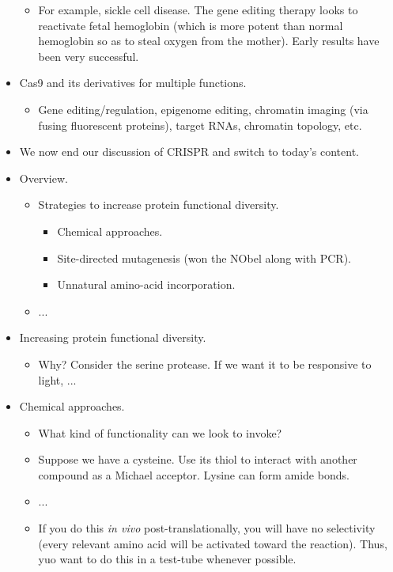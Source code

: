 \documentclass[../notes.tex]{subfiles}
\begin{document}
\begin{itemize}
    \begin{itemize}
        \item For example, sickle cell disease. The gene editing therapy looks to reactivate fetal hemoglobin (which is more potent than normal hemoglobin so as to steal oxygen from the mother). Early results have been very successful.
    \end{itemize}
    \item Cas9 and its derivatives for multiple functions.
    \begin{itemize}
        \item Gene editing/regulation, epigenome editing, chromatin imaging (via fusing fluorescent proteins), target RNAs, chromatin topology, etc.
    \end{itemize}
    \item We now end our discussion of CRISPR and switch to today's content.
    \item Overview.
    \begin{itemize}
        \item Strategies to increase protein functional diversity.
        \begin{itemize}
            \item Chemical approaches.
            \item Site-directed mutagenesis (won the NObel along with PCR).
            \item Unnatural amino-acid incorporation.
        \end{itemize}
        \item ...
    \end{itemize}
    \item Increasing protein functional diversity.
    \begin{itemize}
        \item Why? Consider the serine protease. If we want it to be responsive to light, ...
    \end{itemize}
    \item Chemical approaches.
    \begin{itemize}
        \item What kind of functionality can we look to invoke?
        \item Suppose we have a cysteine. Use its thiol to interact with another compound as a Michael acceptor. Lysine can form amide bonds.
        \item ...
        \item If you do this \emph{in vivo} post-translationally, you will have no selectivity (every relevant amino acid will be activated toward the reaction). Thus, yuo want to do this in a test-tube whenever possible.

\end{itemize}
\end{itemize}
\end{document}
